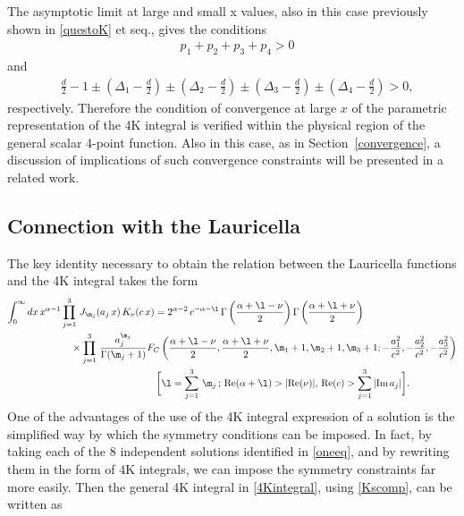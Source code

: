 \documentclass[a4paper,11pt,openright,twoside]{book}
\let\a=\alpha   \let\b=\beta   \let\g=\gamma   \let\d=\delta
\let\n=\nu      \let\x=\xi     \let\p=\pi      \let\r=\rho
\renewcommand{\Re}{\textrm{Re}}
\renewcommand{\Im}{\textrm{Im}}
\newcommand{\secref}[1]{Section~\ref{#1}}		%
\numberwithin{equation}{section}
\begin{document}
{{	The asymptotic limit at large and small x values, also in this case previously shown in 
	\eqref{questoK} et seq., gives the conditions
	\begin{align}
		&p_1+p_2+p_3+p_4>0
	\end{align}
	and
	\begin{align}
		&\frac{d}{2}-1\pm\left(\Delta_1-\frac{d}{2}\right)\pm\left(\Delta_2-\frac{d}{2}\right)\pm\left(\Delta_3-\frac{d}{2}\right)\pm\left(\Delta_4-\frac{d}{2}\right)>0,
	\end{align}
	respectively. Therefore the condition of convergence at large $x$ of the parametric representation of the 4K integral is verified within the physical region of the general scalar 4-point function. Also in this case, as in \secref{convergence}, a discussion of implications of such convergence constraints will be presented in a related work. 
	
	
	
	\subsection{Connection with the Lauricella}
	The key identity necessary to obtain the relation between the Lauricella functions and the 4K integral takes the form
	\begin{align}
		\int_0^\infty dx\,x^{\a-1}\prod_{j=1}^3\,J_{\m_j}(a_j\,x)\,K_{\nu}(c\,x)&=2^{\a-2}\,c^{-\a-\l}\,\Gamma\left(\frac{\a+\l-\n}{2}\right)\Gamma\left(\frac{\a+\l+\n}{2}\right)\notag\\
		&\hspace{-3cm}\times\prod_{j=1}^3\,\frac{a_j^{\m_j}}{\Gamma(\m_j+1)}F_C\left(\frac{\a+\l-\n}{2},\frac{\a+\l+\n}{2},\m_1+1,\m_2+1,\m_3+1;-\frac{a_1^2}{c^2},-\frac{a_2^2}{c^2},-\frac{a_3^2}{c^2}\right)\notag\\
		&\centering\,\bigg[\l=\sum_{j=1}^3\,\m_j\,;\, \Re(\a+\l)>|\Re(\n)|,\,\Re(c)>\sum_{j=1}^{3}|\Im\,a_j|\bigg]\label{Prudnikov}.
	\end{align}
	One of the advantages of the use of the 4K integral expression of a solution is the simplified way by which the symmetry conditions can be imposed. In fact, by taking each of the 8 independent solutions identified in \eqref{oneeq}, and by rewriting them in the form of 4K integrals, we can impose the symmetry constraints far more easily.
	Then the general 4K integral in \eqref{4Kintegral}, using \eqref{Kscomp}, can be written as
	
}}
\end{document}
